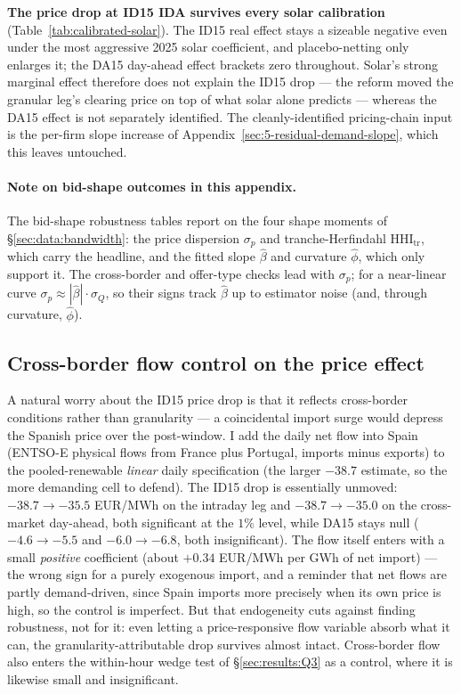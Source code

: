 \documentclass[11pt,a4paper]{article}
\theoremstyle{definition}
\theoremstyle{remark}
\theoremstyle{plain}
\begin{document}
\textbf{The price drop at ID15 IDA survives every solar calibration} (Table~\ref{tab:calibrated-solar}). The ID15 real effect stays a sizeable negative even under the most aggressive 2025 solar coefficient, and placebo-netting only enlarges it; the DA15 day-ahead effect brackets zero throughout. Solar's strong marginal effect therefore does not explain the ID15 drop --- the reform moved the granular leg's clearing price on top of what solar alone predicts --- whereas the DA15 effect is not separately identified. The cleanly-identified pricing-chain input is the per-firm slope increase of Appendix~\ref{sec:5-residual-demand-slope}, which this leaves untouched.

\paragraph{Note on bid-shape outcomes in this appendix.} The bid-shape robustness tables report on the four shape moments of \S\ref{sec:data:bandwidth}: the price dispersion $\sigma_p$ and tranche-Herfindahl $\text{HHI}_{\text{tr}}$, which carry the headline, and the fitted slope $\hat\beta$ and curvature $\hat\phi$, which only support it. The cross-border and offer-type checks lead with $\sigma_p$; for a near-linear curve $\sigma_p \approx |\hat\beta|\cdot\sigma_Q$, so their signs track $\hat\beta$ up to estimator noise (and, through curvature, $\hat\phi$).

\subsection{Cross-border flow control on the price effect}\label{app:xborder-price}

A natural worry about the ID15 price drop is that it reflects cross-border conditions rather than granularity --- a coincidental import surge would depress the Spanish price over the post-window. I add the daily net flow into Spain (ENTSO-E physical flows from France plus Portugal, imports minus exports) to the pooled-renewable \emph{linear} daily specification (the larger $-38.7$ estimate, so the more demanding cell to defend). The ID15 drop is essentially unmoved: $-38.7 \to -35.5$ EUR/MWh on the intraday leg and $-38.7 \to -35.0$ on the cross-market day-ahead, both significant at the $1\%$ level, while DA15 stays null ($-4.6 \to -5.5$ and $-6.0 \to -6.8$, both insignificant). The flow itself enters with a small \emph{positive} coefficient (about $+0.34$ EUR/MWh per GWh of net import) --- the wrong sign for a purely exogenous import, and a reminder that net flows are partly demand-driven, since Spain imports more precisely when its own price is high, so the control is imperfect. But that endogeneity cuts against finding robustness, not for it: even letting a price-responsive flow variable absorb what it can, the granularity-attributable drop survives almost intact. Cross-border flow also enters the within-hour wedge test of \S\ref{sec:results:Q3} as a control, where it is likewise small and insignificant.
\end{document}
